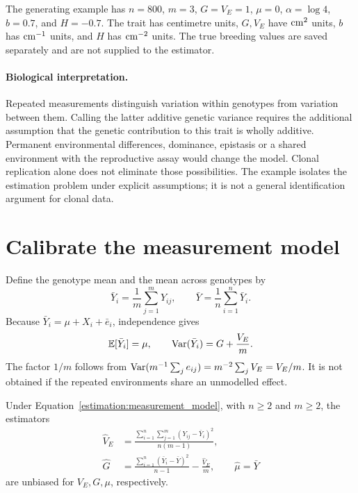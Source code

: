 The generating example has \(n=800\), \(m=3\), \(G=V_E=1\),
\(\mu=0\), \(\alpha=\log4\), \(b=0.7\), and \(H=-0.7\). The trait has centimetre
units, \(G,V_E\) have \({\rm cm}^2\) units, \(b\) has \({\rm cm}^{-1}\) units,
and \(H\) has \({\rm cm}^{-2}\) units. The true breeding values are saved
separately and are not supplied to the estimator.

\paragraph{Biological interpretation.}
Repeated measurements distinguish variation within genotypes from variation
between them. Calling the latter additive genetic variance requires the
additional assumption that the genetic contribution to this trait is wholly
additive. Permanent environmental differences, dominance, epistasis or a
shared environment with the reproductive assay would change the model.
Clonal replication alone does not eliminate those possibilities. The example
isolates the estimation problem under explicit assumptions; it is not a
general identification argument for clonal data.

\section{Calibrate the measurement model}
\label{estimation:calibration}

Define the genotype mean and the mean across genotypes by
\[
 \bar Y_i=\frac1m\sum_{j=1}^mY_{ij},
 \qquad
 \bar Y=\frac1n\sum_{i=1}^n\bar Y_i.
\]
Because \(\bar Y_i=\mu+X_i+\bar e_i\), independence gives
\begin{equation}
 \mathbb E[\bar Y_i]=\mu,\qquad
 \operatorname{Var}(\bar Y_i)=G+\frac{V_E}{m}.
 \label{estimation:mean_measurement_variance}
\end{equation}
The factor \(1/m\) follows from
\(\operatorname{Var}(m^{-1}\sum_j e_{ij})=m^{-2}\sum_jV_E=V_E/m\).
It is not obtained if the repeated environments share an unmodelled effect.

\begin{proposition}
\label{estimation:anova_calibration}
Under Equation~\eqref{estimation:measurement_model}, with \(n\geq2\) and
\(m\geq2\), the estimators
\begin{align}
 \widehat V_E
 &=\frac{\sum_{i=1}^n\sum_{j=1}^m(Y_{ij}-\bar Y_i)^2}{n(m-1)},\nonumber\\
 \widehat G
 &=\frac{\sum_{i=1}^n(\bar Y_i-\bar Y)^2}{n-1}
   -\frac{\widehat V_E}{m},
 \qquad
 \widehat\mu=\bar Y
 \label{estimation:calibration_estimators}
\end{align}
are unbiased for \(V_E,G,\mu\), respectively.
\end{proposition}

